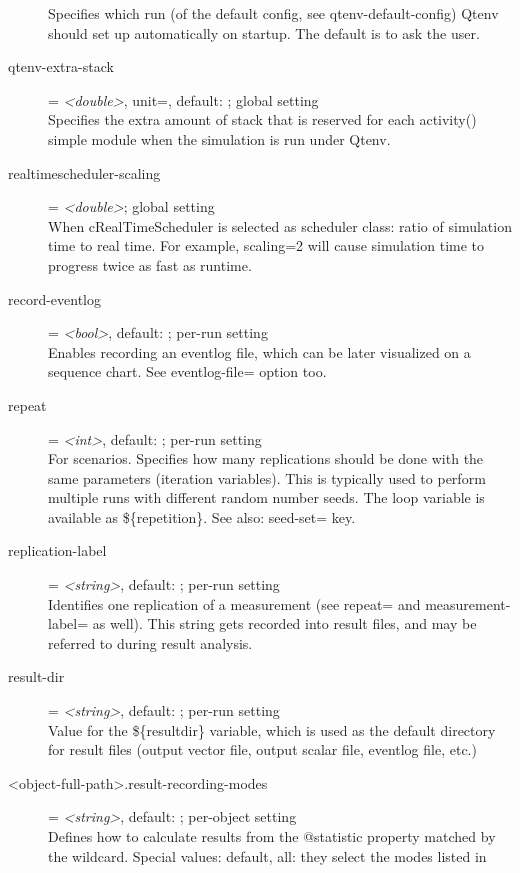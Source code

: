 \begin{description}
    Specifies which run (of the default config, see qtenv-default-config) Qtenv
    should set up automatically on startup. The default is to ask the user.
\item[qtenv-extra-stack] = \textit{<double>}, unit=, default: ; global setting \\
    Specifies the extra amount of stack that is reserved for each activity()
    simple module when the simulation is run under Qtenv.
\item[realtimescheduler-scaling] = \textit{<double>}; global setting \\
    When cRealTimeScheduler is selected as scheduler class: ratio of simulation
    time to real time. For example, scaling=2 will cause simulation time to
    progress twice as fast as runtime.
\item[record-eventlog] = \textit{<bool>}, default: ; per-run setting \\
    Enables recording an eventlog file, which can be later visualized on a
    sequence chart. See eventlog-file= option too.
\item[repeat] = \textit{<int>}, default: ; per-run setting \\
    For scenarios. Specifies how many replications should be done with the same
    parameters (iteration variables). This is typically used to perform
    multiple runs with different random number seeds. The loop variable is
    available as \$\{repetition\}. See also: seed-set= key.
\item[replication-label] = \textit{<string>}, default: ; per-run setting \\
    Identifies one replication of a measurement (see repeat= and
    measurement-label= as well). This string gets recorded into result files,
    and may be referred to during result analysis.
\item[result-dir] = \textit{<string>}, default: ; per-run setting \\
    Value for the \$\{resultdir\} variable, which is used as the default
    directory for result files (output vector file, output scalar file,
    eventlog file, etc.)
\item[<object-full-path>.result-recording-modes] = \textit{<string>}, default: ; per-object setting \\
    Defines how to calculate results from the @statistic property matched by
    the wildcard. Special values: default, all: they select the modes listed in

\end{description}
